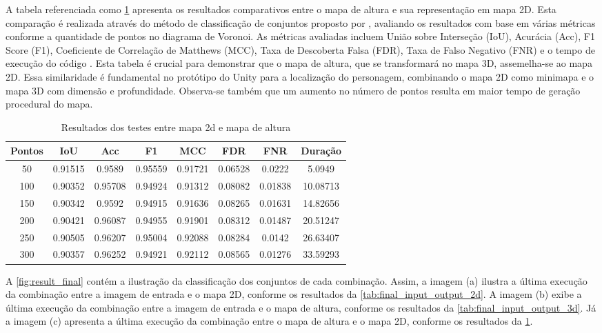 A tabela referenciada como \cref{tab:final_output_2d_output_3d} apresenta os resultados comparativos entre o mapa de altura e sua representação em mapa 2D. Esta comparação é realizada através do método de classificação de conjuntos proposto por \cite{kirillov2019panoptic}, avaliando os resultados com base em várias métricas conforme a quantidade de pontos no diagrama de Voronoi. As métricas avaliadas incluem União sobre Interseção (IoU), Acurácia (Acc), F1 Score (F1), Coeficiente de Correlação de Matthews (MCC), Taxa de Descoberta Falsa (FDR), Taxa de Falso Negativo (FNR) e o tempo de execução do código \cite{Chicco2020, confusion_matrix_calculator, iou_metric_link}. Esta tabela é crucial para demonstrar que o mapa de altura, que se transformará no mapa 3D, assemelha-se ao mapa 2D. Essa similaridade é fundamental no protótipo do Unity para a localização do personagem, combinando o mapa 2D como minimapa e o mapa 3D com dimensão e profundidade. Observa-se também que um aumento no número de pontos resulta em maior tempo de geração procedural do mapa.


\begin{table}[h]
	\centering
	\caption{Resultados dos testes entre mapa 2d e mapa de altura}
	\label{tab:final_output_2d_output_3d}
	\begin{tabular}{|c|c|c|c|c|c|c|c|}
		\hline
						Pontos & IoU & Acc & F1 & MCC & FDR & FNR & Duração \\
		\hline
		50 & 0.91515 & 0.9589 & 0.95559 & 0.91721 & 0.06528 & 0.0222 & 5.0949\\
100 & 0.90352 & 0.95708 & 0.94924 & 0.91312 & 0.08082 & 0.01838 & 10.08713\\
150 & 0.90342 & 0.9592 & 0.94915 & 0.91636 & 0.08265 & 0.01631 & 14.82656\\
200 & 0.90421 & 0.96087 & 0.94955 & 0.91901 & 0.08312 & 0.01487 & 20.51247\\
250 & 0.90505 & 0.96207 & 0.95004 & 0.92088 & 0.08284 & 0.0142 & 26.63407\\
300 & 0.90357 & 0.96252 & 0.94921 & 0.92112 & 0.08565 & 0.01276 & 33.59293\\
		\hline
	\end{tabular}
\end{table}

A \cref{fig:result_final} contém a ilustração da classificação dos conjuntos de cada combinação. Assim, a imagem (a) ilustra a última execução da combinação entre a imagem de entrada e o mapa 2D, conforme os resultados da \cref{tab:final_input_output_2d}. A imagem (b) exibe a última execução da combinação entre a imagem de entrada e o mapa de altura, conforme os resultados da \cref{tab:final_input_output_3d}. Já a imagem (c) apresenta a última execução da combinação entre o mapa de altura e o mapa 2D, conforme os resultados da \cref{tab:final_output_2d_output_3d}.

